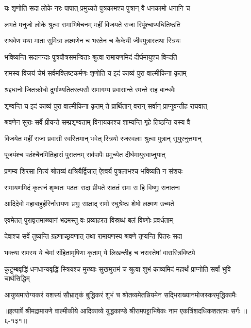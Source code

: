\twolineshloka
{यः शृणोति सदा लोके नरः पापात् प्रमुच्यते}
{पुत्रकामश्च पुत्रान् वै धनकामो धनानि च} %

\twolineshloka
{लभते मनुजो लोके श्रुत्वा रामाभिषेचनम्}
{महीं विजयते राजा रिपूंश्चाप्यधितिष्ठति} %

\twolineshloka
{राघवेण यथा माता सुमित्रा लक्ष्मणेन च}
{भरतेन च कैकेयी जीवपुत्रास्तथा स्त्रियः} %

\twolineshloka
{भविष्यन्ति सदानन्दाः पुत्रपौत्रसमन्विताः}
{श्रुत्वा रामायणमिदं दीर्घमायुश्च विन्दति} %

\twolineshloka
{रामस्य विजयं चेमं सर्वमक्लिष्टकर्मणः}
{शृणोति य इदं काव्यं पुरा वाल्मीकिना कृतम्} %

\twolineshloka
{श्रद्दधानो जितक्रोधो दुर्गाण्यतितरत्यसौ}
{समागम्य प्रवासान्ते रमन्ते सह बान्धवैः} %

\twolineshloka
{शृण्वन्ति य इदं काव्यं पुरा वाल्मीकिना कृतम्}
{ते प्रार्थितान् वरान् सर्वान् प्राप्नुवन्तीह राघवात्} %

\twolineshloka
{श्रवणेन सुराः सर्वे प्रीयन्ते सम्प्रशृण्वताम्}
{विनायकाश्च शाम्यन्ति गृहे तिष्ठन्ति यस्य वै} %

\twolineshloka
{विजयेत महीं राजा प्रवासी स्वस्तिमान् भवेत्}
{स्त्रियो रजस्वलाः श्रुत्वा पुत्रान् सूयुरनुत्तमान्} %

\twolineshloka
{पूजयंश्च पठंश्चैनमितिहासं पुरातनम्}
{सर्वपापैः प्रमुच्येत दीर्घमायुरवाप्नुयात्} %

\twolineshloka
{प्रणम्य शिरसा नित्यं श्रोतव्यं क्षत्रियैर्द्विजात्}
{ऐश्वर्यं पुत्रलाभश्च भविष्यति न संशयः} %

\twolineshloka
{रामायणमिदं कृत्स्नं शृण्वतः पठतः सदा}
{प्रीयते सततं रामः स हि विष्णुः सनातनः} %

\twolineshloka
{आदिदेवो महाबाहुर्हरिर्नारायणः प्रभुः}
{साक्षाद् रामो रघुश्रेष्ठः शेषो लक्ष्मण उच्यते} %

\twolineshloka
{एवमेतत् पुरावृत्तमाख्यानं भद्रमस्तु वः}
{प्रव्याहरत विस्रब्धं बलं विष्णोः प्रवर्धताम्} %

\twolineshloka
{देवाश्च सर्वे तुष्यन्ति ग्रहणाच्छ्रवणात् तथा}
{रामायणस्य श्रवणे तृप्यन्ति पितरः सदा} %

\twolineshloka
{भक्त्या रामस्य ये चेमां संहितामृषिणा कृताम्}
{ये लिखन्तीह च नरास्तेषां वासस्त्रिविष्टपे} %

\twolineshloka
{कुटुम्बवृद्धिं धनधान्यवृद्धिं स्त्रियश्च मुख्याः सुखमुत्तमं च}
{श्रुत्वा शुभं काव्यमिदं महार्थं प्राप्नोति सर्वां भुवि चार्थसिद्धिम्} %

\twolineshloka
{आयुष्यमारोग्यकरं यशस्यं सौभ्रातृकं बुद्धिकरं शुभं च}
{श्रोतव्यमेतन्नियमेन सद्भिराख्यानमोजस्करमृद्धिकामैः} %


॥इत्यार्षे श्रीमद्रामायणे वाल्मीकीये आदिकाव्ये युद्धकाण्डे श्रीरामपट्टाभिषेकः नाम एकत्रिंशदधिकशततमः सर्गः ॥६-१३१॥
